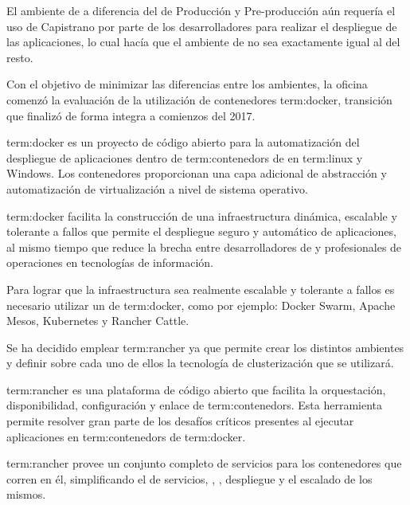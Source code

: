 El ambiente de  a diferencia del de Producción y Pre-producción
aún requería el uso de Capistrano por parte de los desarrolladores para
realizar el despliegue de las aplicaciones, lo cual hacía que el ambiente de
 no sea exactamente igual al del resto.

Con el objetivo de minimizar las diferencias entre los ambientes, la oficina
comenzó la evaluación de la utilización de contenedores \gls{term:docker},
transición que finalizó de forma integra a comienzos del 2017.

\gls{term:docker} es un proyecto de código abierto para la automatización del
despliegue de aplicaciones dentro de \glspl{term:contenedor} de 
en \gls{term:linux} y Windows. Los contenedores proporcionan una capa adicional
de abstracción y automatización de virtualización a nivel de sistema operativo.

\gls{term:docker} facilita la construcción de una infraestructura dinámica,
escalable y tolerante a fallos que permite el despliegue seguro y automático
de aplicaciones, al mismo tiempo que reduce la brecha entre desarrolladores de
 y profesionales de operaciones en tecnologías de información.

Para lograr que la infraestructura sea realmente escalable y tolerante a fallos
es necesario utilizar un  de \gls{term:docker}, como por ejemplo:
Docker Swarm, Apache Mesos, Kubernetes y Rancher Cattle.

Se ha decidido emplear \gls{term:rancher} ya que permite crear los distintos
ambientes y definir sobre cada uno de ellos la tecnología de clusterización que
se utilizará.

\gls{term:rancher} es una plataforma de código abierto que facilita la
orquestación, disponibilidad, configuración y enlace de
\glspl{term:contenedor}. Esta herramienta permite resolver gran parte de los
desafíos críticos presentes al ejecutar aplicaciones en \glspl{term:contenedor}
de \gls{term:docker}.

\gls{term:rancher} provee un conjunto completo de servicios para los
contenedores que corren en él, simplificando el  de servicios,
, , despliegue y el escalado de los mismos.
